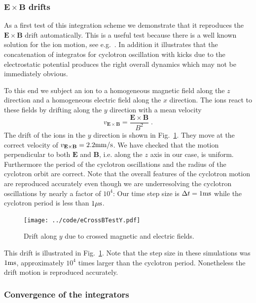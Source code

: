 \documentclass[
  aps,
  reprint,
  twoside,
  showpacs,
  amsmath,
  amssymb,
  floatfix
]{revtex4-1}
\begin{document}
\subsubsection{$\mathbf{E}\times\mathbf{B}$ drifts}
\label{sssec:eCrossB}

As a first test of this integration scheme we demonstrate that it
reproduces the $\mathbf{E}\times \mathbf{B}$ drift automatically.  This
is a useful test because there is a well known solution for the ion
motion, see e.g.~\cite{Jackson}.  In addition it illustrates that the
concatenation of integratos for cyclotron oscillation with kicks due to
the electrostatic potential produces the right overall dynamics which
may not be immediately obvious.

To this end we subject an ion to a homogeneous magnetic field along the
$z$ direction and a homogeneous electric field along the $x$ direction.
The ions react to these fields by drifting along the $y$ direction with
a mean velocity
\begin{equation}
v_{\mathbf{E}\times\mathbf{B}}=\frac{\mathbf{E}\times\mathbf{B}}{B^2}\;.
\end{equation}
The drift of the ions in the $y$ direction is shown in
Fig.~\ref{fig:driftXY}.  They move at the correct velocity of
$v_{\mathbf{E}\times\mathbf{B}}=2.2{\rm mm/s}$.  We have checked that
the motion perpendicular to both $\mathbf{E}$ and $\mathbf{B}$, i.e.
along the $z$ axis in our case, is uniform.  Furthermore the period of
the cyclotron oscillations and the radius of the cyclotron orbit are
correct.  Note that the overall features of the cyclotron motion are
reproduced accurately even though we are underresolving the cyclotron
oscillations by nearly a factor of $10^4$: Our time step size is $\Delta
t= 1{\rm ms}$ while the cyclotron period is less than $1\mu{\rm s}$.

\begin{figure}
\texttt{[image: ../code/eCrossBTestY.pdf]}
\caption{Drift along $y$ due to crossed magnetic and electric fields.}
\label{fig:driftXY}
\end{figure}

This drift is illustrated in Fig.~\ref{fig:driftXY}.  Note that the step
size in these simulations was $1{\rm ms}$, approximately $10^4$ times
larger than the cyclotron period.  Nonetheless the drift motion is
reproduced accurately.


\subsubsection{Convergence of the integrators}
\end{document}
